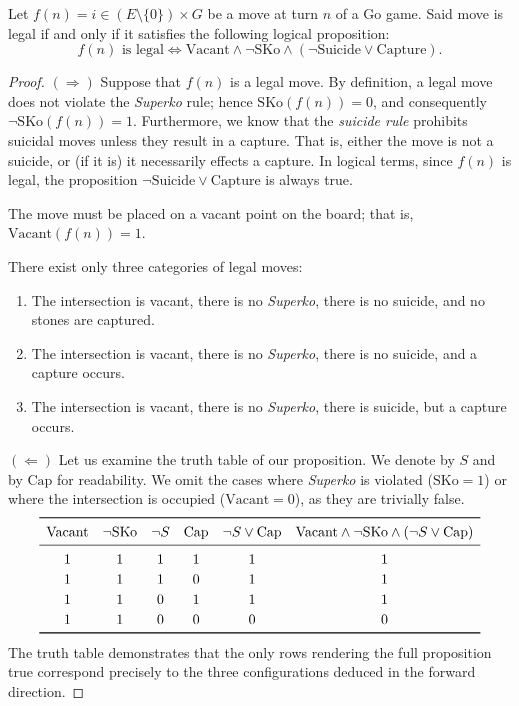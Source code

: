 \begin{theorem}\label{teo_jugada_legal}
	Let $f(n) = i \in (E \setminus \{0\}) \times G$ be a move at turn $n$ of a Go game. Said move is legal if and only if it satisfies the following logical proposition:
	$$f(n) \text{ is legal} \iff \text{Vacant} \wedge \neg \text{SKo} \wedge (\neg \text{Suicide} \vee \text{Capture}).$$
	\end{theorem}
\begin{proof}
	
	$(\Rightarrow)$ Suppose that $f(n)$ is a legal move.
	By definition, a legal move does not violate the \textit{Superko} rule; hence $\text{SKo}(f(n))=0$, and consequently $\neg\text{SKo}(f(n))=1$.
	Furthermore, we know that the \textit{suicide rule} prohibits suicidal moves unless they result in a capture. That is, either the move is not a suicide, or (if it is) it necessarily effects a capture. In logical terms, since $f(n)$ is legal, the proposition $\neg\text{Suicide} \vee \text{Capture}$ is always true.
	
	The move must be placed on a vacant point on the board; that is, $\text{Vacant}(f(n))=1$.
	
	
	There exist only three categories of legal moves:
	\begin{enumerate}
		\item The intersection is vacant, there is no \textit{Superko}, there is no suicide, and no stones are captured.
		\item The intersection is vacant, there is no \textit{Superko}, there is no suicide, and a capture occurs.
		\item The intersection is vacant, there is no \textit{Superko}, there is suicide, but a capture occurs.
	\end{enumerate}
	$(\Leftarrow)$ Let us examine the truth table of our proposition. We denote  by $S$ and  by $\text{Cap}$ for readability. We omit the cases where \textit{Superko} is violated ($\text{SKo}=1$) or where the intersection is occupied ($\text{Vacant}=0$), as they are trivially false.
	\[
	\renewcommand{\arraystretch}{1.2}
	\setlength{\tabcolsep}{10pt}
	\begin{array}{cccccc}
		\toprule
		\text{Vacant} & \neg \text{SKo} & \neg S & \text{Cap} & \neg S \vee \text{Cap} & \text{Vacant} \wedge \neg \text{SKo} \wedge (\neg S \vee \text{Cap}) \\ 
		\midrule
		1 & 1 & 1 & 1 & 1 & 1 \\
		1 & 1 & 1 & 0 & 1 & 1 \\
		1 & 1 & 0 & 1 & 1 & 1 \\
		1 & 1 & 0 & 0 & 0 & 0 \\
		\bottomrule
	\end{array}
	\]
	The truth table demonstrates that the only rows rendering the full proposition true correspond precisely to the three configurations deduced in the forward direction.
\end{proof}

